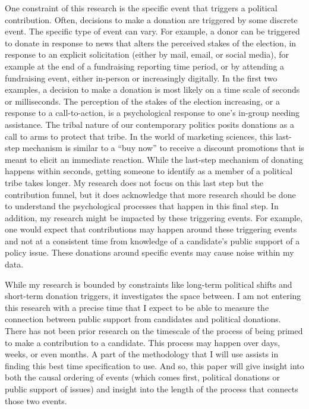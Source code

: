\documentclass[12pt,]{article}
\begin{document}
One constraint of this research is the specific event that triggers a
political contribution. Often, decisions to make a donation are
triggered by some discrete event. The specific type of event can vary.
For example, a donor can be triggered to donate in response to news that
alters the perceived stakes of the election, in response to an explicit
solicitation (either by mail, email, or social media), for example at
the end of a fundraising reporting time period, or by attending a
fundraising event, either in-person or increasingly digitally. In the
first two examples, a decision to make a donation is most likely on a
time scale of seconds or milliseconds. The perception of the stakes of
the election increasing, or a response to a call-to-action, is a
psychological response to one's in-group needing assistance. The tribal
nature of our contemporary politics posits donations as a call to arms
to protect that tribe. In the world of marketing sciences, this
last-step mechanism is similar to a ``buy now'' to receive a discount
promotions that is meant to elicit an immediate reaction. While the
last-step mechanism of donating happens within seconds, getting someone
to identify as a member of a political tribe takes longer. My research
does not focus on this last step but the contribution funnel, but it
does acknowledge that more research should be done to understand the
psychological processes that happen in this final step. In addition, my
research might be impacted by these triggering events. For example, one
would expect that contributions may happen around these triggering
events and not at a consistent time from knowledge of a candidate's
public support of a policy issue. These donations around specific events
may cause noise within my data.

While my research is bounded by constraints like long-term political
shifts and short-term donation triggers, it investigates the space
between. I am not entering this research with a precise time that I
expect to be able to measure the connection between public support from
candidates and political donations. There has not been prior research on
the timescale of the process of being primed to make a contribution to a
candidate. This process may happen over days, weeks, or even months. A
part of the methodology that I will use assists in finding this best
time specification to use. And so, this paper will give insight into
both the causal ordering of events (which comes first, political
donations or public support of issues) and insight into the length of
the process that connects those two events.





\newpage
\singlespacing 
\end{document}
